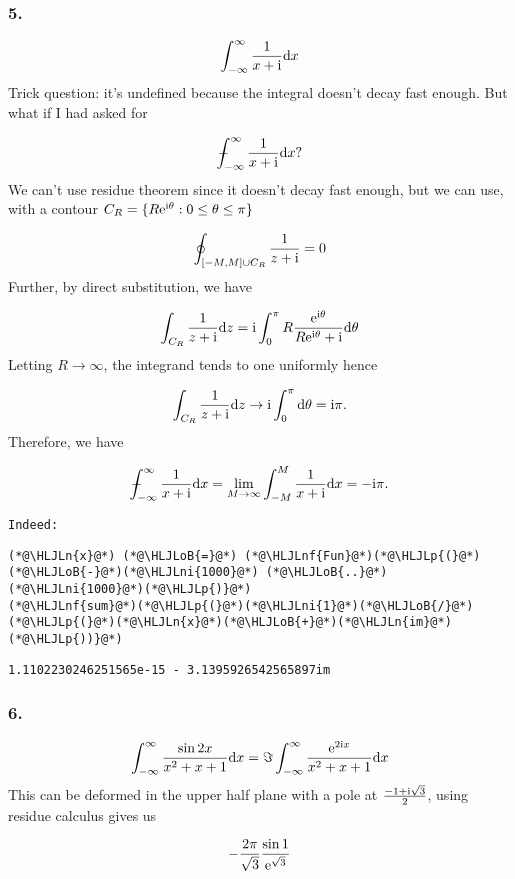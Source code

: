 \documentclass[12pt,a4paper]{article}
\newcommand{\HLJLn}[1]{#1}
\newcommand{\HLJLnf}[1]{\textcolor[RGB]{66,102,213}{#1}}
\newcommand{\HLJLni}[1]{\textcolor[RGB]{59,151,46}{#1}}
\newcommand{\HLJLoB}[1]{\textcolor[RGB]{102,102,102}{\textbf{#1}}}
\newcommand{\HLJLp}[1]{#1}
\def\D{ {\rm d} }
\def\I{ {\rm i} }
\def\E{ {\rm e} }
\def\Xint#1{ \mathchoice
   {\XXint\displaystyle\textstyle{#1} }%
   {\XXint\textstyle\scriptstyle{#1} }%
   {\XXint\scriptstyle\scriptscriptstyle{#1} }%
   {\XXint\scriptscriptstyle\scriptscriptstyle{#1} }%
   \!\int}
\def\XXint#1#2#3{ {\setbox0=\hbox{$#1{#2#3}{\int}$}
     \vcenter{\hbox{$#2#3$}}\kern-.5\wd0} }
\def\dashint{\Xint-}
\def\dx{\D x}
\def\dz{\D z}
\begin{document}
\subsubsection{5.}
\[
	\int_{-\infty}^\infty    {1 \over x + \I } \dx
\]
Trick question: it's undefined because the integral doesn't decay fast enough. But what if I had asked for

\[
	\dashint_{-\infty}^\infty    {1 \over x + \I } \dx?
\]
We can't use residue theorem since it doesn't decay fast enough, but we can use, with a contour $C_R = \{ R \E^{\I \theta} : 0 \leq \theta \leq \pi \}$

\[
\oint_{[-M, M] \cup C_R} {1 \over z + \I}   = 0
\]
Further, by direct substitution, we have

\[
\int_{C_R} {1 \over z + \I}\dz = \I \int_0^\pi  R {\E^{\I \theta} \over R \E^{\I \theta} + \I} \D \theta
\]
Letting $R \rightarrow \infty$, the integrand tends to one uniformly hence

\[
 \int_{C_R} {1 \over z + \I}\dz  \rightarrow \I \int_0^\pi  \D \theta  = \I \pi.
\]
Therefore, we have

\[
	\dashint_{-\infty}^\infty    {1 \over x + \I } \dx = \lim_{M\rightarrow \infty} \int_{-M}^M {1 \over x + \I}  \dx =  - \I \pi .
\]
\begin{verbatim}
Indeed:
\end{verbatim}

\begin{lstlisting}
(*@\HLJLn{x}@*) (*@\HLJLoB{=}@*) (*@\HLJLnf{Fun}@*)(*@\HLJLp{(}@*)(*@\HLJLoB{-}@*)(*@\HLJLni{1000}@*) (*@\HLJLoB{..}@*) (*@\HLJLni{1000}@*)(*@\HLJLp{)}@*)
(*@\HLJLnf{sum}@*)(*@\HLJLp{(}@*)(*@\HLJLni{1}@*)(*@\HLJLoB{/}@*)(*@\HLJLp{(}@*)(*@\HLJLn{x}@*)(*@\HLJLoB{+}@*)(*@\HLJLn{im}@*)(*@\HLJLp{))}@*)
\end{lstlisting}

\begin{lstlisting}
1.1102230246251565e-15 - 3.1395926542565897im
\end{lstlisting}


\subsubsection{6.}
\[
\int_{-\infty}^\infty    {\sin 2x \over x^2 + x + 1} \dx = \Im \int_{-\infty}^\infty    {\E^{ 2 \I x} \over x^2 + x + 1} \dx
\]
This can be deformed in the upper half plane with a pole at ${-1 + \I \sqrt{3} \over 2}$, using residue calculus gives us

\[
   -{2 \pi \over \sqrt 3} {\sin 1 \over \E^{\sqrt{3}}}
\]
\end{document}

